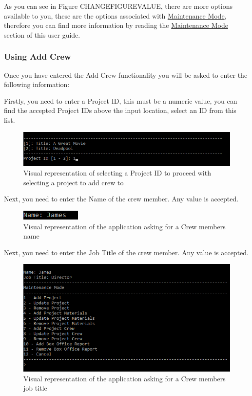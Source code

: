 \documentclass[
  english,
  a4paper,
,tablecaptionabove
]{scrartcl}
\begin{document}
As you can see in Figure CHANGEFIGUREVALUE, there are more options
available to you, these are the options associated with
\protect\hyperlink{using-maintenance-mode}{Maintenance Mode}, therefore
you can find more information by reading the
\protect\hyperlink{using-maintenance-mode}{Maintenance Mode} section of
this user guide.

\newpage

\hypertarget{using-add-crew}{%
\subsubsection{Using Add Crew}\label{using-add-crew}}

Once you have entered the Add Crew functionality you will be asked to
enter the following information:

Firstly, you need to enter a Project ID, this must be a numeric value,
you can find the accepted Project IDs above the input location, select
an ID from this list.

\begin{figure}
\centering
\includegraphics{images/user-guide/maintenance-mode/update-project-select-id.png}
\caption{Visual representation of selecting a Project ID to proceed with
selecting a project to add crew to}
\end{figure}

Next, you need to enter the Name of the crew member. Any value is
accepted.

\begin{figure}
\centering
\includegraphics{images/user-guide/maintenance-mode/add-crew-name.png}
\caption{Visual representation of the application asking for a Crew
members name}
\end{figure}

Next, you need to enter the Job Title of the crew member. Any value is
accepted.

\begin{figure}
\centering
\includegraphics{images/user-guide/maintenance-mode/add-crew-job-title.png}
\caption{Visual representation of the application asking for a Crew
members job title}
\end{figure}
\end{document}
